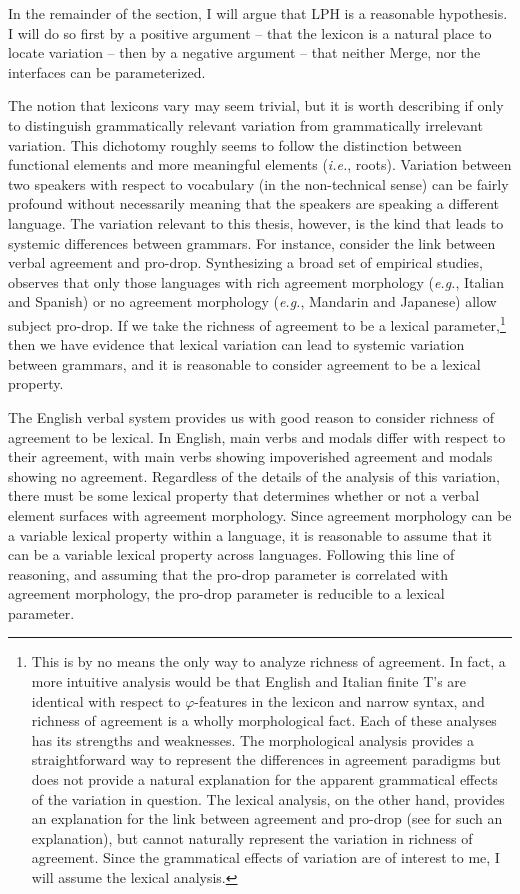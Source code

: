 In the remainder of the section, I will argue that LPH is a reasonable hypothesis.
I will do so first by a positive argument -- that the lexicon is a natural place to locate variation -- then by a negative argument -- that neither Merge, nor the interfaces can be parameterized.

The notion that lexicons vary may seem trivial, but it is worth describing if only to distinguish grammatically relevant variation from grammatically irrelevant variation.
This dichotomy roughly seems to follow the distinction between functional elements and more meaningful elements (\textit{i.e.}, roots).
Variation between two speakers with respect to vocabulary (in the non-technical sense) can be fairly profound without necessarily meaning that the speakers are speaking a different language.
The variation relevant to this thesis, however, is the kind that leads to systemic differences between grammars.
For instance, consider the link between verbal agreement and pro-drop.
Synthesizing a broad set of empirical studies, \textcite{huang1984distribution} observes that only those languages with rich agreement morphology (\textit{e.g.}, Italian and Spanish) or no agreement morphology (\textit{e.g.}, Mandarin and Japanese) allow subject pro-drop.
If we take the richness of agreement to be a lexical parameter,\footnote{
	This is by no means the only way to analyze richness of agreement.
	In fact, a more intuitive analysis would be that English and Italian finite T's are identical with respect to $\varphi$-features in the lexicon and narrow syntax, and richness of agreement is a wholly morphological fact.
	Each of these analyses has its strengths and weaknesses.
	The morphological analysis provides a straightforward way to represent the differences in agreement paradigms but does not provide a natural explanation for the apparent grammatical effects of the variation in question.
	The lexical analysis, on the other hand, provides an explanation for the link between agreement and pro-drop (see \cite{chomsky2015problems} for such an explanation), but cannot naturally represent the variation in richness of agreement.
	Since the grammatical effects of variation are of interest to me, I will assume the lexical analysis.
} then we have evidence that lexical variation can lead to systemic variation between grammars, and it is reasonable to consider agreement to be a lexical property.

The English verbal system provides us with good reason to consider richness of agreement to be lexical.
In English, main verbs and modals differ with respect to their agreement, with main verbs showing impoverished agreement and modals showing no agreement.
Regardless of the details of the analysis of this variation, there must be some lexical property that determines whether or not a verbal element surfaces with agreement morphology.
Since agreement morphology can be a variable lexical property within a language, it is reasonable to assume that it can be a variable lexical property across languages.
Following this line of reasoning, and assuming that the pro-drop parameter is correlated with agreement morphology, the pro-drop parameter is reducible to a lexical parameter.

